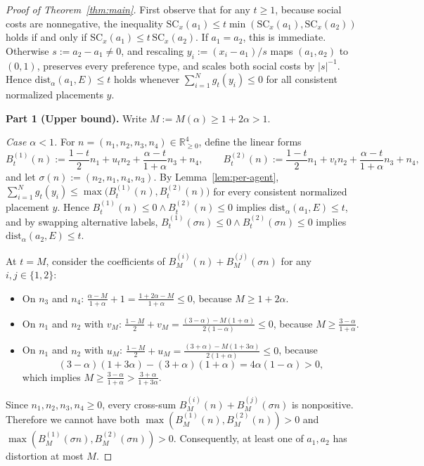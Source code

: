 \documentclass[11pt]{article}
\begin{document}
\begin{proof}[Proof of Theorem~\ref{thm:main}]
First observe that for any $t \ge 1$, because social costs are nonnegative, the
inequality $\mathrm{SC}_x(a_1) \le t\min(\mathrm{SC}_x(a_1), \mathrm{SC}_x(a_2))$
holds if and only if $\mathrm{SC}_x(a_1) \le t\,\mathrm{SC}_x(a_2)$. If
$a_1 = a_2$, this is immediate. Otherwise $s := a_2 - a_1 \ne 0$, and rescaling
$y_i := (x_i - a_1)/s$ maps $(a_1, a_2)$ to $(0, 1)$, preserves every
preference type, and scales both social costs by $|s|^{-1}$. Hence
$\mathrm{dist}_\alpha(a_1, E) \le t$ holds whenever
$\sum_{i=1}^N g_t(y_i) \le 0$ for all consistent normalized placements $y$.

\medskip
\noindent\textbf{Part 1 (Upper bound).}
Write $M := M(\alpha) \ge 1 + 2\alpha > 1$.

\emph{Case $\alpha < 1$.} For $n = (n_1, n_2, n_3, n_4) \in \mathbb{R}_{\ge 0}^4$,
define the linear forms
\[
B_t^{(1)}(n) := \frac{1 - t}{2} n_1 + u_t n_2 + \frac{\alpha - t}{1 + \alpha} n_3 + n_4,
\qquad
B_t^{(2)}(n) := \frac{1 - t}{2} n_1 + v_t n_2 + \frac{\alpha - t}{1 + \alpha} n_3 + n_4,
\]
and let $\sigma(n) := (n_2, n_1, n_4, n_3)$. By Lemma~\ref{lem:per-agent},
$\sum_{i=1}^N g_t(y_i) \le \max\bigl(B_t^{(1)}(n), B_t^{(2)}(n)\bigr)$ for
every consistent normalized placement $y$. Hence
$B_t^{(1)}(n) \le 0 \land B_t^{(2)}(n) \le 0$ implies
$\mathrm{dist}_\alpha(a_1, E) \le t$, and by swapping alternative labels,
$B_t^{(1)}(\sigma n) \le 0 \land B_t^{(2)}(\sigma n) \le 0$ implies
$\mathrm{dist}_\alpha(a_2, E) \le t$.

At $t = M$, consider the coefficients of $B_M^{(i)}(n) + B_M^{(j)}(\sigma n)$
for any $i, j \in \{1, 2\}$:
\begin{itemize}
\item On $n_3$ and $n_4$:
$\frac{\alpha - M}{1 + \alpha} + 1 = \frac{1 + 2\alpha - M}{1 + \alpha} \le 0$,
because $M \ge 1 + 2\alpha$.
\item On $n_1$ and $n_2$ with $v_M$:
$\frac{1 - M}{2} + v_M = \frac{(3 - \alpha) - M(1 + \alpha)}{2(1 - \alpha)} \le 0$,
because $M \ge \frac{3 - \alpha}{1 + \alpha}$.
\item On $n_1$ and $n_2$ with $u_M$:
$\frac{1 - M}{2} + u_M = \frac{(3 + \alpha) - M(1 + 3\alpha)}{2(1 + \alpha)} \le 0$,
because
\[
(3 - \alpha)(1 + 3\alpha) - (3 + \alpha)(1 + \alpha) = 4\alpha(1 - \alpha) > 0,
\]
which implies $M \ge \frac{3 - \alpha}{1 + \alpha} > \frac{3 + \alpha}{1 + 3\alpha}$.
\end{itemize}
Since $n_1, n_2, n_3, n_4 \ge 0$, every cross-sum
$B_M^{(i)}(n) + B_M^{(j)}(\sigma n)$ is nonpositive. Therefore we cannot have
both $\max(B_M^{(1)}(n), B_M^{(2)}(n)) > 0$ and
$\max(B_M^{(1)}(\sigma n), B_M^{(2)}(\sigma n)) > 0$. Consequently, at least
one of $a_1, a_2$ has distortion at most $M$.


\end{proof}
\end{document}
